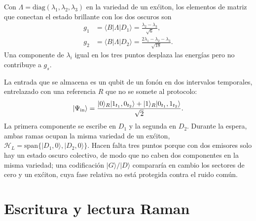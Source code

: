 \documentclass[aps,pra,twocolumn,groupedaddress,amsmath,amssymb,floatfix]{revtex4-2}
\newcommand{\ket}[1]{\lvert #1\rangle}
\newcommand{\bra}[1]{\langle #1\rvert}
\begin{document}
Con $\Lambda=\mathrm{diag}(\lambda_1,\lambda_2,\lambda_3)$ en la variedad de un ex\'citon, los elementos de matriz que conectan el estado brillante con los dos oscuros son
\begin{align}
g_1&=\bra B\Lambda\ket{D_1}=\frac{\lambda_2-\lambda_3}{\sqrt6},\nonumber\\
g_2&=\bra B\Lambda\ket{D_2}=\frac{2\lambda_1-\lambda_2-\lambda_3}{\sqrt{18}}.\label{eq:g}
\end{align}
Una componente de $\lambda_i$ igual en los tres puntos desplaza las energ\'ias pero no contribuye a $g_s$.

La entrada que se almacena es un qubit de un fon\'on en dos intervalos temporales, entrelazado con una referencia $R$ que no se somete al protocolo:
\begin{equation}
\ket{\Psi_{\rm in}}=\frac{\ket0_R\ket{1_{t_1},0_{t_2}}+\ket1_R\ket{0_{t_1},1_{t_2}}}{\sqrt2}.
\label{eq:input}
\end{equation}
La primera componente se escribe en $D_1$ y la segunda en $D_2$. Durante la espera, ambas ramas ocupan la misma variedad de un ex\'citon, $\mathcal H_L=\mathrm{span}\{\ket{D_1,0},\ket{D_2,0}\}$. Hacen falta tres puntos porque con dos emisores solo hay un estado oscuro colectivo, de modo que no caben dos componentes en la misma variedad; una codificaci\'on $\ket G/\ket D$ comparar\'ia en cambio los sectores de cero y un ex\'citon, cuya fase relativa no est\'a protegida contra el ruido com\'un.

\section{Escritura y lectura Raman}
\label{sec:raman}
\end{document}
